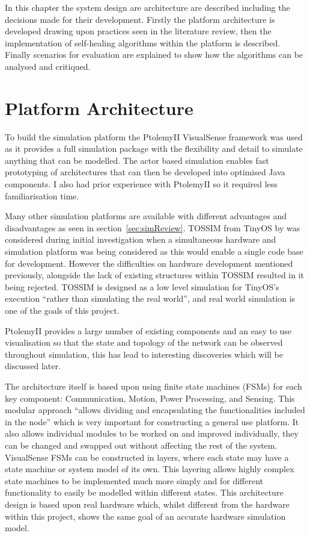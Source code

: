 \documentclass[authoryearcitations]{UoYCSproject}
\begin{document}
In this chapter the system design are architecture are described including the decisions made for their development. Firstly the platform architecture is developed drawing upon practices seen in the literature review, then the implementation of self-healing algorithms within the platform is described. Finally scenarios for evaluation are explained to show how the algorithms can be analysed and critiqued.

\section{Platform Architecture}

To build the simulation platform the PtolemyII VisualSense framework \citep{Baldwin2005} was used as it provides a full simulation package with the flexibility and detail to simulate anything that can be modelled. The actor based simulation enables fast prototyping of architectures that can then be developed into optimised Java components. I also had prior experience with PtolemyII so it required less familiarisation time.

Many other simulation platforms are available with different advantages and disadvantages as seen in section~\ref{sec:simReview}. TOSSIM \citep{Levis2003} from TinyOS by \citet{Levis2005} was considered during initial investigation when a simultaneous hardware and simulation platform was being considered as this would enable a single code base for development. However the difficulties on hardware development mentioned previously, alongside the lack of existing structures within TOSSIM resulted in it being rejected. TOSSIM is designed as a low level simulation for TinyOS's execution ``rather than simulating the real world'', and real world simulation is one of the goals of this project.

PtolemyII provides a large number of existing components and an easy to use visualisation so that the state and topology of the network can be observed throughout simulation, this has lead to interesting discoveries which will be discussed later.

The architecture itself is based upon \citet{Rosello2009} using finite state machines (FSMs) for each key component: Communication, Motion, Power Processing, and Sensing. This modular approach ``allows dividing and encapsulating the functionalities included in the node'' which is very important for constructing a general use platform. It also allows individual modules to be worked on and improved individually, they can be changed and swapped out without affecting the rest of the system. VisualSense FSMs can be constructed in layers, where each state may have a state machine or system model of its own. This layering allows highly complex state machines to be implemented much more simply and for different functionality to easily be modelled within different states. This architecture design is based upon real hardware which, whilst different from the hardware within this project, shows the same goal of an accurate hardware simulation model.
\end{document}
